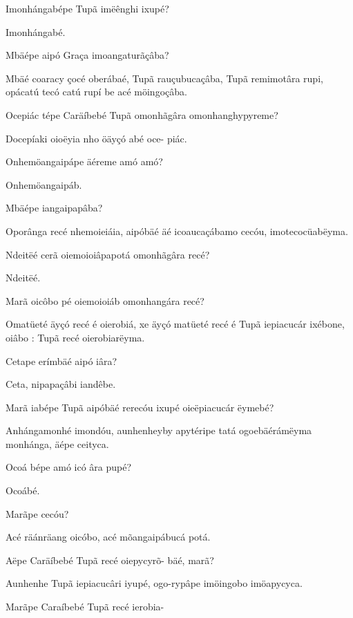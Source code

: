 \documentclass[openany,titlepage,12pt]{book}
\begin{document}
\begin{alternate}
    \item Imonhángabépe Tupã imëênghi ixupé?
    \item Imonhángabé.\newpage
    \vspace*{-15pt}
    \item Mbäépe aipó Graça imoangaturãçâba?
    \item Mbäé coaracy çocé oberábaé, Tupã rauçubucaçâba,
    Tupã remimotâra rupi, opácatú tecó catú rupí
    be acé möingoçâba.
    \item Ocepiác tépe Caräíbebé Tupã omonhãgâra omonhanghypyreme?
    \item Docepíaki oioëyia nho öäyçó abé oce-\linebreak
    piác.
    \item Onhemöangaipápe äéreme amó amó?
    \item Onhemöangaipáb.
    \item Mbäépe iangaipapâba?
    \item Oporânga recé nhemoieiáia, aipóbäé äé icoaucaçábamo
    cecóu, imotecocüabëyma.
    \item Ndeitëé cerã oiemoioiâpapotá omonhãgâra recé?
    \item Ndeitëé.
    \item Marã oicôbo pé oiemoioiáb omonhangára recé?
    \item Omatüeté äyçó recé é oierobiá, xe äyçó
    matüeté recé é Tupã iepiacucár ixébone, oiâbo : 
    Tupã recé oierobiarëyma.
    \item Cetape erímbäé aipó iâra?
    \item Ceta, nipapaçâbi iandêbe.
    \item Marã iabépe Tupã aipóbäé rerecóu ixupé
    oieëpiacucár ëymebé?
    \item Anhángamonhé imondóu, aunhenhe\linebreak yby
    apytéripe tatá ogoebäérámëyma monhánga,
    äépe ceityca.
    \item Ocoá bépe amó icó âra pupé?
    \item Ocoábé.
    \item Marãpe cecóu?
    \item Acé räánräang oicóbo, acé mõangaipábucá potá.
    \item Aëpe Caräíbebé Tupã recé oiepycyrõ-\linebreak
    bäé, marã?
    \item Aunhenhe Tupã iepiacucâri iyupé, ogo-rypâpe
    imöingobo imöapycyca.
    \item Marãpe Caraíbebé Tupã recé ierobia-\linebreak

\end{alternate}
\end{document}
